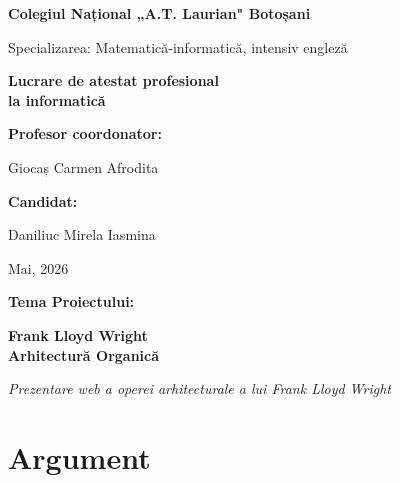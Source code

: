 \documentclass[12pt,a4paper]{report}
\begin{document}
\begin{titlepage}
  \centering
  {\Large\bfseries Colegiul Național „A.T. Laurian" Botoșani\par}
  \vspace{0.2cm}
  {\large Specializarea: Matematică-informatică, intensiv engleză\par}
  \vspace{1.5cm}
  \vfill
  {\huge\bfseries Lucrare de atestat profesional\\[0.3cm] la informatică\par}
  \vfill

  {\large\bfseries Profesor coordonator:}\\[0.2cm]
  {\large Giocaș Carmen Afrodita\par}
  \vspace{1cm}
  {\large\bfseries Candidat:}\\[0.2cm]
  {\large Daniliuc Mirela Iasmina\par}
  \vspace{1.5cm}
  {\large Mai, 2026}
\end{titlepage}


\thispagestyle{empty}
\vspace*{\fill}
\begin{center}
  {\large\bfseries Tema Proiectului:\par}
  \vspace{0.5cm}
  {\LARGE\bfseries Frank Lloyd Wright\\[0.3cm]
   Arhitectură Organică\par}
  \vspace{0.4cm}
  {\large\itshape Prezentare web a operei arhitecturale a lui Frank Lloyd Wright\par}
\end{center}
\vspace*{\fill}
\newpage

\tableofcontents
\newpage

\chapter{Argument}
\end{document}
